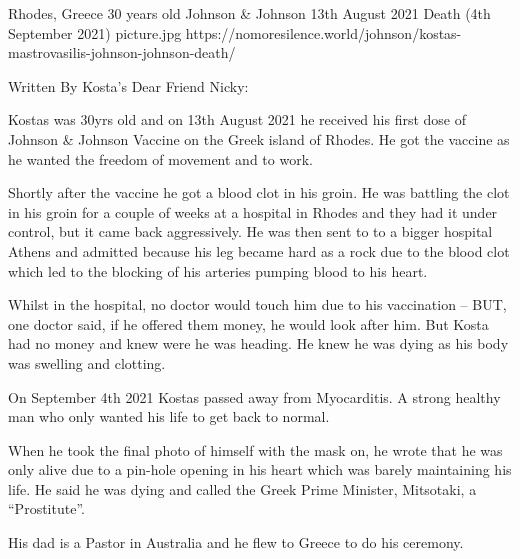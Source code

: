 {Rhodes, Greece}
{30 years old}
{Johnson \& Johnson}
{13th August 2021}
{Death (4th September 2021)}
{picture.jpg}
{https://nomoresilence.world/johnson/kostas-mastrovasilis-johnson-johnson-death/}
{

Written By Kosta’s Dear Friend Nicky:

Kostas was 30yrs old and on 13th August 2021 he received his first dose of
Johnson \& Johnson Vaccine on the Greek island of Rhodes. He got the vaccine as
he wanted the freedom of movement and to work.

Shortly after the vaccine he got a blood clot in his groin. He was battling the
clot in his groin for a couple of weeks at a hospital in Rhodes and they had it
under control, but it came back aggressively. He was then sent to to a bigger
hospital Athens and admitted because his leg became hard as a rock due to the
blood clot which led to the blocking of his arteries pumping blood to his heart.

Whilst in the hospital, no doctor would touch him due to his vaccination – BUT,
one doctor said, if he offered them money, he would look after him. But Kosta
had no money and knew were he was heading. He knew he was dying as his body was
swelling and clotting.

On September 4th 2021 Kostas passed away from Myocarditis. A strong healthy man
who only wanted his life to get back to normal.

When he took the final photo of himself with the mask on, he wrote that he was
only alive due to a pin-hole opening in his heart which was barely maintaining
his life. He said he was dying and called the Greek Prime Minister, Mitsotaki, a
“Prostitute”.

His dad is a Pastor in Australia and he flew to Greece to do his ceremony.

}
